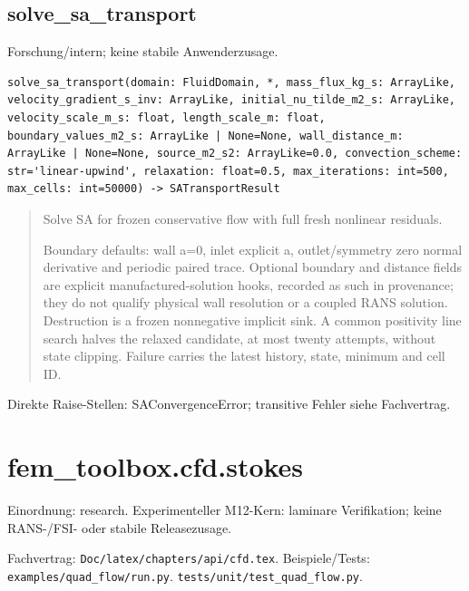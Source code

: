 \subsection{solve\_sa\_transport}
Forschung/intern; keine stabile Anwenderzusage.
\begin{lstlisting}
solve_sa_transport(domain: FluidDomain, *, mass_flux_kg_s: ArrayLike, velocity_gradient_s_inv: ArrayLike, initial_nu_tilde_m2_s: ArrayLike, velocity_scale_m_s: float, length_scale_m: float, boundary_values_m2_s: ArrayLike | None=None, wall_distance_m: ArrayLike | None=None, source_m2_s2: ArrayLike=0.0, convection_scheme: str='linear-upwind', relaxation: float=0.5, max_iterations: int=500, max_cells: int=50000) -> SATransportResult
\end{lstlisting}
\begin{quote}
Solve SA for frozen conservative flow with full fresh nonlinear residuals.\par Boundary defaults: wall a=0, inlet explicit a, outlet/symmetry zero normal derivative and periodic paired trace. Optional boundary and distance fields are explicit manufactured-solution hooks, recorded as such in provenance; they do not qualify physical wall resolution or a coupled RANS solution. Destruction is a frozen nonnegative implicit sink. A common positivity line search halves the relaxed candidate, at most twenty attempts, without state clipping. Failure carries the latest history, state, minimum and cell ID.
\end{quote}
Direkte Raise-Stellen: SAConvergenceError; transitive Fehler siehe Fachvertrag.
\section{fem\_toolbox.cfd.stokes}
Einordnung: research. Experimenteller M12-Kern: laminare Verifikation; keine RANS-/FSI- oder stabile Releasezusage.
\par Fachvertrag: \nolinkurl{Doc/latex/chapters/api/cfd.tex}. Beispiele/Tests:
\nolinkurl{examples/quad_flow/run.py}.
\nolinkurl{tests/unit/test_quad_flow.py}.
